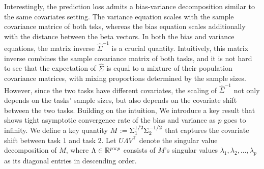 Interestingly, the prediction loss admits a bias-variance decomposition similar to the same covariates setting.
The variance equation scales with the sample covariance matrice of both tsks, whereas the bias equation scales additionally with the distance between the beta vectors.
In both the bias and variance equations, the matrix inverse $\hat{\Sigma}^{-1}$ is a crucial quantity.
Intuitively, this matrix inverse combines the sample covariance matrix of both tasks, and it is not hard to see that the expectation of $\hat{\Sigma}$ is equal to a mixture of their population covariance matrices, with mixing proportions determined by the sample sizes.
However, since the two tasks have different covariates, the scaling of $\hat{\Sigma}^{-1}$ not only depends on the tasks' sample sizes, but also depends on the covariate shift between the two tasks.
Building on the intuition, We introduce a key result that shows tight asymptotic convergence rate of the bias and variance as $p$ goes to infinity.
We define a key quantity $M := \Sigma_1^{1/2}\Sigma_2^{-1/2}$ that captures the covariate shift between task $1$ and task $2$.
Let $U\Lambda V^\top$ denote the singular value decomposition of $M$, where $\Lambda\in\mathbb{R}^{p\times p}$ consists of $M$'s singular values $\lambda_1, \lambda_2, \dots, \lambda_p$ as its diagonal entries in descending order.

